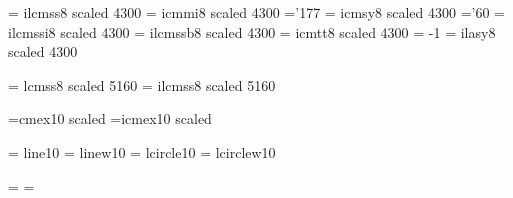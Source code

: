 \font\ithirtyfourrm   = ilcmss8  scaled 4300 %
\font\ithirtyfouri    = icmmi8   scaled 4300 %
    \skewchar\ithirtyfouri ='177                  %
\font\ithirtyfoursy   = icmsy8   scaled 4300 %
    \skewchar\ithirtyfoursy ='60           %
\font\ithirtyfourit   = ilcmssi8 scaled 4300 %
\font\ithirtyfourbf   = ilcmssb8 scaled 4300 %
\font\ithirtyfourtt   = icmtt8   scaled 4300 %
    \hyphenchar\ithirtyfourtt = -1         %
\font\ithirtyfourlasy = ilasy8  scaled 4300 %

\font\fortyonerm  = lcmss8  scaled 5160 %
\font\ifortyonerm = ilcmss8 scaled 5160 %

\font\tenex =cmex10  scaled
\font\itenex=icmex10 scaled

\font\tenln    = line10
\font\tenlnw   = linew10
\font\tencirc  = lcircle10
\font\tencircw = lcirclew10

\ifnum{}\tenln=\tencirc \else 
  \fi
\ifnum{}\tenlnw=\tencircw \else 
  \fi


\lineskip 1pt
\normallineskip 1pt

\def\@subfam#1#2{\@warning{No \string#1\space typeface in 
        SLiTeX, using \string#2}#2}


\def\rm{\protect\prm}
\def\it{\protect\pit}
\def\bf{\protect\pbf}
\def\tt{\protect\ptt}
\def\sl{\@subfam\sl\it}
\def\sf{\@subfam\sf\rm}
\def\sc{\@subfam\sc\rm}

\def\em{\protect\pem{}}
\def\pem{\ifdim \fontdimen\@ne\font >\z@ \rm \else \it \fi}

\def\mit{\fam\@ne} 
\def\cal{\fam\tw@}

\def\boldmath{\@warning{No \string\boldmath\space in SLiTeX}}
\let\unboldmath=\relax

\def\@nomath#1{\ifmmode \@warning{\string#1\space in math mode.}\fi}


%
\newfam\itfam      %
\newfam\slfam      %
\newfam\bffam      %
\newfam\ttfam      %
\newfam\sffam      %
\newfam\scfam      %
\newfam\lyfam      %


